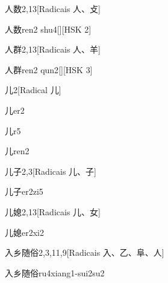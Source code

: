 \begin{entry}{人数}{2,13}[Radicais ⼈、⽁]
  \begin{phonetics}{人数}{ren2 shu4}[][HSK 2]
  \end{phonetics}
\end{entry}

\begin{entry}{人群}{2,13}[Radicais ⼈、⽺]
  \begin{phonetics}{人群}{ren2 qun2}[][HSK 3]
  \end{phonetics}
\end{entry}

\begin{entry}{儿}{2}[Radical ⼉]
  \begin{phonetics}{儿}{er2}
  \end{phonetics}
  \begin{phonetics}{儿}{r5}
  \end{phonetics}
  \begin{phonetics}{儿}{ren2}
  \end{phonetics}
\end{entry}

\begin{entry}{儿子}{2,3}[Radicais ⼉、⼦]
  \begin{phonetics}{儿子}{er2zi5}
  \end{phonetics}
\end{entry}

\begin{entry}{儿媳}{2,13}[Radicais ⼉、⼥]
  \begin{phonetics}{儿媳}{er2xi2}
  \end{phonetics}
\end{entry}

\begin{entry}{入乡随俗}{2,3,11,9}[Radicais ⼊、⼄、⾩、⼈]
  \begin{phonetics}{入乡随俗}{ru4xiang1-sui2su2}
  \end{phonetics}
\end{entry}

